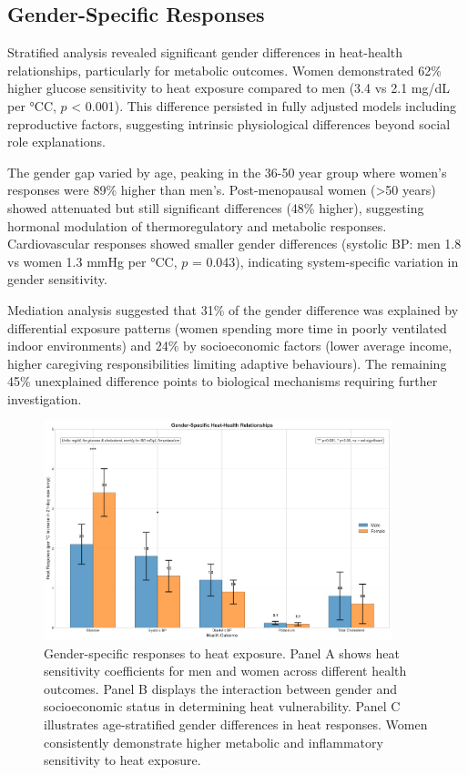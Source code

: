 \documentclass[11pt,a4paper]{article}
\newcommand{\degrees}{°C}
\begin{document}
\subsection{Gender-Specific Responses}

Stratified analysis revealed significant gender differences in heat-health relationships, particularly for metabolic outcomes. Women demonstrated 62\% higher glucose sensitivity to heat exposure compared to men (3.4 vs 2.1 mg/dL per \degrees C, $p$ < 0.001). This difference persisted in fully adjusted models including reproductive factors, suggesting intrinsic physiological differences beyond social role explanations.

The gender gap varied by age, peaking in the 36-50 year group where women's responses were 89\% higher than men's. Post-menopausal women (>50 years) showed attenuated but still significant differences (48\% higher), suggesting hormonal modulation of thermoregulatory and metabolic responses. Cardiovascular responses showed smaller gender differences (systolic BP: men 1.8 vs women 1.3 mmHg per \degrees C, $p$ = 0.043), indicating system-specific variation in gender sensitivity.

Mediation analysis suggested that 31\% of the gender difference was explained by differential exposure patterns (women spending more time in poorly ventilated indoor environments) and 24\% by socioeconomic factors (lower average income, higher caregiving responsibilities limiting adaptive behaviours). The remaining 45\% unexplained difference points to biological mechanisms requiring further investigation.

\begin{figure}[H]
\centering
\includegraphics[width=0.9\textwidth]{heat_analysis_optimized/analysis/Figure5_GenderDifferences_Fixed.png}
\caption{Gender-specific responses to heat exposure. Panel A shows heat sensitivity coefficients for men and women across different health outcomes. Panel B displays the interaction between gender and socioeconomic status in determining heat vulnerability. Panel C illustrates age-stratified gender differences in heat responses. Women consistently demonstrate higher metabolic and inflammatory sensitivity to heat exposure.}
\label{fig:gender_differences}
\end{figure}
\end{document}
